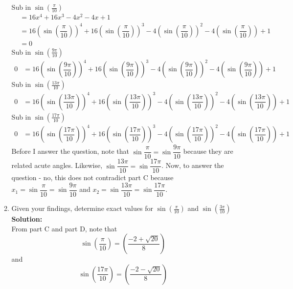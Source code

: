 \documentclass[12pt]{book}
\begin{document}
\begin{enumerate}
\begin{enumerate}
Sub in $\sin(\frac{\pi}{10})$
\setcounter{equation}{0}
\begin{align}
    &= 16x^4 + 16x^3 - 4x^2 -4x + 1 \\
    &= 16\left(\sin\left(\dfrac{\pi}{10}\right) \right)^4 + 16\left(\sin\left(\dfrac{\pi}{10}\right) \right)^3 - 4\left(\sin\left(\dfrac{\pi}{10}\right) \right)^2 -4\left(\sin\left(\dfrac{\pi}{10}\right) \right) + 1 \\
    &= 0
\end{align}
Sub in $\sin(\frac{9\pi}{10})$
\begin{align}
    0 &= 16\left(\sin\left(\dfrac{9\pi}{10}\right) \right)^4 + 16\left(\sin\left(\dfrac{9\pi}{10}\right) \right)^3 - 4\left(\sin\left(\dfrac{9\pi}{10}\right) \right)^2 -4\left(\sin\left(\dfrac{9\pi}{10}\right) \right) + 1
\end{align}
Sub in $\sin(\frac{13\pi}{10})$
\begin{align}
    0 &= 16\left(\sin\left(\dfrac{13\pi}{10}\right) \right)^4 + 16\left(\sin\left(\dfrac{13\pi}{10}\right) \right)^3 - 4\left(\sin\left(\dfrac{13\pi}{10}\right) \right)^2 -4\left(\sin\left(\dfrac{13\pi}{10}\right) \right) + 1
\end{align}
Sub in $\sin(\frac{17\pi}{10})$
\begin{align}
    0 &= 16\left(\sin\left(\dfrac{17\pi}{10}\right) \right)^4 + 16\left(\sin\left(\dfrac{17\pi}{10}\right) \right)^3 - 4\left(\sin\left(\dfrac{17\pi}{10}\right) \right)^2 -4\left(\sin\left(\dfrac{17\pi}{10}\right) \right) + 1
\end{align}
Before I answer the question, note that $\sin\dfrac{\pi}{10} = \sin\dfrac{9\pi}{10}$ because they are related acute angles. Likewise, $\sin\dfrac{13\pi}{10} = \sin\dfrac{17\pi}{10}$. Now, to answer the question - no, this does not contradict part C because $x_1 = \sin\dfrac{\pi}{10} = \sin\dfrac{9\pi}{10}$ and $x_2 = \sin\dfrac{13\pi}{10} = \sin\dfrac{17\pi}{10}$.
\fi %

\item Given your findings, determine exact values for $\sin(\frac{\pi}{10})$ and $\sin(\frac{3\pi}{10})$\\

\textbf{Solution:}\\

From part C and part D, note that $$\sin\left(\dfrac{\pi}{10}\right) = \left(\dfrac{-2 + \sqrt{20}}{8}\right)$$ and $$\sin\left(\dfrac{17\pi}{10}\right) = \left(\dfrac{-2 - \sqrt{20}}{8}\right)$$


\end{enumerate}
\end{enumerate}
\end{document}
